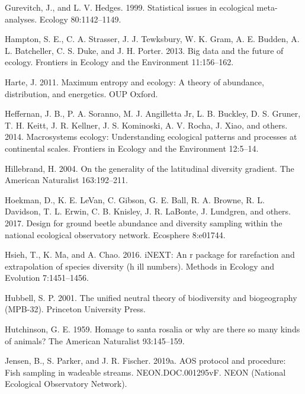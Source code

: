 \documentclass[
  12pt,
]{article}
\newlength{\cslhangindent}
\newlength{\cslentryspacingunit} %
\newenvironment{CSLReferences}[2] %
 {%
  \setlength{\parindent}{0pt}
  \ifodd #1
  \let\oldpar\par
  \def\par{\hangindent=\cslhangindent\oldpar}
  \fi
  \setlength{\parskip}{#2\cslentryspacingunit}
 }%
 {}
\begin{document}
\begin{CSLReferences}{1}{0}
\leavevmode{}%
Gurevitch, J., and L. V. Hedges. 1999. Statistical issues in ecological meta-analyses. Ecology 80:1142--1149.

\leavevmode{}%
Hampton, S. E., C. A. Strasser, J. J. Tewksbury, W. K. Gram, A. E. Budden, A. L. Batcheller, C. S. Duke, and J. H. Porter. 2013. Big data and the future of ecology. Frontiers in Ecology and the Environment 11:156--162.

\leavevmode{}%
Harte, J. 2011. Maximum entropy and ecology: A theory of abundance, distribution, and energetics. OUP Oxford.

\leavevmode{}%
Heffernan, J. B., P. A. Soranno, M. J. Angilletta Jr, L. B. Buckley, D. S. Gruner, T. H. Keitt, J. R. Kellner, J. S. Kominoski, A. V. Rocha, J. Xiao, and others. 2014. Macrosystems ecology: Understanding ecological patterns and processes at continental scales. Frontiers in Ecology and the Environment 12:5--14.

\leavevmode{}%
Hillebrand, H. 2004. On the generality of the latitudinal diversity gradient. The American Naturalist 163:192--211.

\leavevmode{}%
Hoekman, D., K. E. LeVan, C. Gibson, G. E. Ball, R. A. Browne, R. L. Davidson, T. L. Erwin, C. B. Knisley, J. R. LaBonte, J. Lundgren, and others. 2017. Design for ground beetle abundance and diversity sampling within the national ecological observatory network. Ecosphere 8:e01744.

\leavevmode{}%
Hsieh, T., K. Ma, and A. Chao. 2016. iNEXT: An r package for rarefaction and extrapolation of species diversity (h ill numbers). Methods in Ecology and Evolution 7:1451--1456.

\leavevmode{}%
Hubbell, S. P. 2001. The unified neutral theory of biodiversity and biogeography (MPB-32). Princeton University Press.

\leavevmode{}%
Hutchinson, G. E. 1959. Homage to santa rosalia or why are there so many kinds of animals? The American Naturalist 93:145--159.

\leavevmode{}%
Jensen, B., S. Parker, and J. R. Fischer. 2019a. AOS protocol and procedure: Fish sampling in wadeable streams. NEON.DOC.001295vF. NEON (National Ecological Observatory Network).


\end{CSLReferences}
\end{document}
